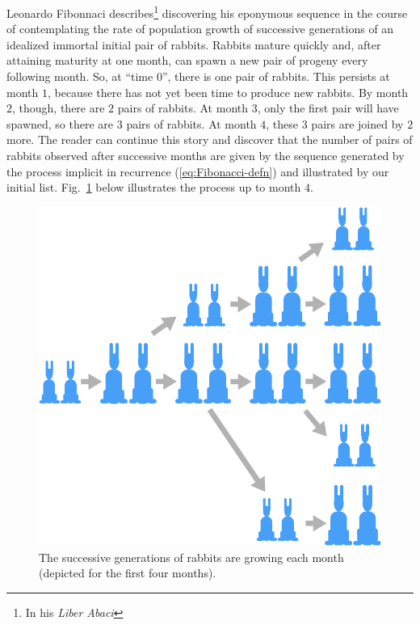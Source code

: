 Leonardo Fibonnaci describes\footnote{In his {\it Liber Abaci}}
discovering his eponymous sequence in the course of contemplating the
rate of population growth of successive generations of an idealized
immortal initial pair of rabbits.  Rabbits mature quickly and, after
attaining maturity at one month, can spawn a new pair of progeny every
following month.  So, at ``time $0$'', there is one pair of rabbits.
This persists at month $1$, because there has not yet been time to
produce new rabbits.  By month $2$, though, there are $2$ pairs of
rabbits.  At month $3$, only the first pair will have spawned, so
there are $3$ pairs of rabbits.  At month $4$, these $3$ pairs are
joined by $2$ more.  The reader can continue this story and discover
that the number of pairs of rabbits observed after successive months
are given by the sequence generated by the process implicit in
recurrence (\ref{eq:Fibonacci-defn}) and illustrated by our initial list.
Fig.~\ref{fig:fibo5} below illustrates the process up to month $4$.
\begin{figure}[htb]
\begin{center}
        \includegraphics[scale=0.3]{FiguresMaths//Fibo5}
\caption{The successive generations of rabbits are growing each month
  (depicted for the first four months).}
        \label{fig:fibo5}
\end{center}
\end{figure}

